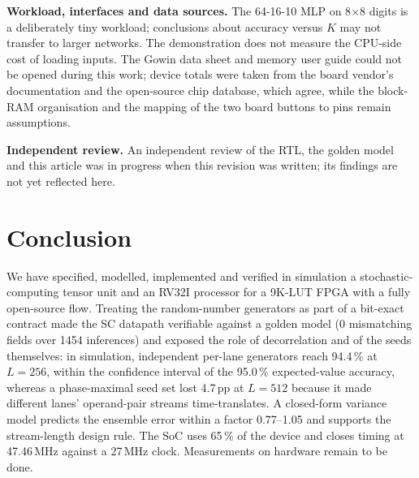 \documentclass[conference]{IEEEtran}
\begin{document}
\textbf{Workload, interfaces and data sources.} The 64-16-10 MLP on
8$\times$8 digits is a deliberately tiny workload; conclusions about accuracy
versus $K$ may not transfer to larger networks. The demonstration does not
measure the CPU-side cost of loading inputs. The Gowin data sheet and memory
user guide could not be opened during this work; device totals were taken
from the board vendor's documentation and the open-source chip database,
which agree, while the block-RAM organisation and the mapping of the two
board buttons to pins remain assumptions.

\textbf{Independent review.} An independent review of the RTL, the golden
model and this article was in progress when this revision was written; its
findings are not yet reflected here.

\section{Conclusion}
\label{sec:conclusion}
We have specified, modelled, implemented and verified in simulation a
stochastic-computing tensor unit and an RV32I processor for a 9K-LUT FPGA with
a fully open-source flow. Treating the random-number generators as part of a
bit-exact contract made the SC datapath verifiable against a golden model
(0 mismatching fields over 1454 inferences) and exposed the role of
decorrelation and of the seeds themselves: in simulation, independent
per-lane generators reach 94.4\,\% at $L=256$, within the confidence interval
of the 95.0\,\% expected-value accuracy, whereas a phase-maximal seed set lost
4.7\,pp at $L=512$ because it made different lanes' operand-pair streams
time-translates. A closed-form variance model predicts the ensemble error
within a factor 0.77--1.05 and supports the stream-length design rule. The
SoC uses 65\,\% of the device and closes timing at 47.46\,MHz against a
27\,MHz clock. Measurements on hardware remain to be done.



\end{document}
